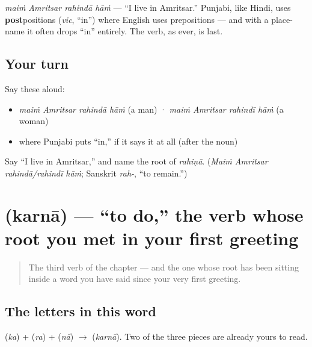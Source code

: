 \begin{grammarlens}[title={Grammar Lens: \textquotedblleft{}in\textquotedblright{} comes after the noun (or is dropped)}]
\emph{maiṁ Amritsar rahindā hāṁ} — \textquotedblleft{}I live in Amritsar.\textquotedblright{} Punjabi, like Hindi, uses \textbf{post}positions (\emph{vic}, \textquotedblleft{}in\textquotedblright{}) where English uses prepositions — and with a place-name it often drops \textquotedblleft{}in\textquotedblright{} entirely. The verb, as ever, is last.
\end{grammarlens}

\subsection*{Your turn}
Say these aloud:

\begin{itemize}
\raggedright
  \item \emph{maiṁ Amritsar rahindā hāṁ} (a man)  ·  \emph{maiṁ Amritsar rahindī hāṁ} (a woman)
  \item where Punjabi puts \textquotedblleft{}in,\textquotedblright{} if it says it at all (after the noun)
\end{itemize}

\begin{tcolorbox}[breakable,colback=teal!4,colframe=teal!35!black,title={Before you move on}]
Say \textquotedblleft{}I live in Amritsar,\textquotedblright{} and name the root of \emph{rahiṇā}. (\emph{Maiṁ Amritsar rahindā/rahindī hāṁ}; Sanskrit \emph{rah-}, \textquotedblleft{}to remain.\textquotedblright{})
\end{tcolorbox}
\section[\texorpdfstring{\pa{ਕਰਨਾ} (karnā)}{ਕਰਨਾ (karnā)}]{ (karnā) — \textquotedblleft{}to do,\textquotedblright{} the verb whose root you met in your first greeting}

\label{lesson:PA-C05-karna}



\begin{quote}
The third verb of the chapter — and the one whose root has been sitting inside a word you have said since your very first greeting.
\end{quote}

\subsection*{The letters in this word}
\textbf{} (\emph{ka}) + \textbf{} (\emph{ra}) + \textbf{} (\emph{nā}) $\to$ \textbf{} (\emph{karnā}). Two of the three pieces are already yours to read.

